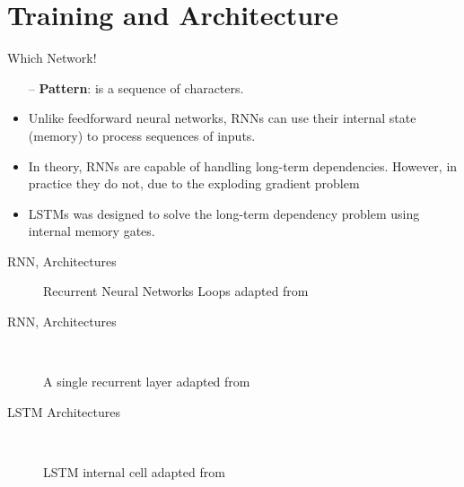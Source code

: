 \section{Training and Architecture}

\begin{frame}[fragile]{Which Network!}


		\begin{itemize}
			\item[--] \textbf{Pattern}: is a sequence of characters.
			\item  Unlike feedforward neural networks, RNNs can use their internal state (memory) to process sequences of inputs.
			\item In theory, RNNs are capable of handling long-term dependencies. 	However, in practice they do not, due to the \alert{exploding gradient problem}
			\item LSTMs was designed to solve the long-term dependency problem using internal memory gates.
		\end{itemize}
		
\end{frame}
\begin{frame}[fragile]{RNN, Architectures}
\begin{figure}[t]
	\minipage{\textwidth}
	\centering
	
	\endminipage\hfill
	\caption{Recurrent Neural Networks Loops adapted from~\cite{colah}}\label{Fig:RNN_Rolled_Loop}
	
\end{figure}%
\end{frame}

\begin{frame}[fragile]{RNN, Architectures}
\begin{figure}[t]
	
	\endminipage\hfill
	
	\endminipage\hfill
	
	\endminipage
	\caption{A single recurrent layer adapted from~\cite{colah}}~\label{Fig:LSTM_SimpleRNN}
\end{figure}%
\end{frame}

\begin{frame}[fragile]{LSTM Architectures}
\begin{center}
\begin{figure}[t]
	
	\endminipage
	\caption{LSTM internal cell adapted from~\cite{colah}}~\label{Fig:LSTM_Cell_Chaining}
\end{figure}%
\end{center}
\end{frame}

